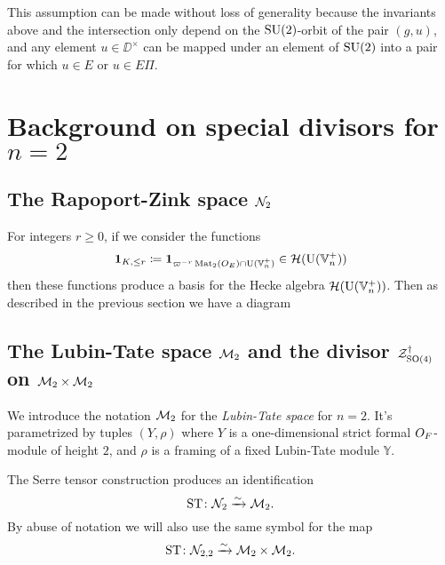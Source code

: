 This assumption can be made without loss of generality because
the invariants above and the intersection only depend
on the $\operatorname{SU}(2)$-orbit of the pair $(g,u)$,
and any element $u \in \DD^\times$ can be mapped under an element of $\operatorname{SU}(2)$
into a pair for which $u \in E$ or $u \in E \Pi$.


\section{Background on special divisors for $n = 2$}
\subsection{The Rapoport-Zink space $\mathcal N_2$}
For integers $r \ge 0$, if we consider the functions
\[ \mathbf{1}_{K, \le r} \coloneqq \mathbf{1}_{\varpi^{-r} \operatorname{Mat}_2(O_E) \cap \operatorname{U}(\mathbb V_n^+)} \in \mathcal H(\operatorname{U}(\mathbb V_n^+)) \]
then these functions produce a basis for the Hecke algebra $\mathcal H(\operatorname{U}(\mathbb V_n^+))$.
Then as described in the previous section we have a diagram
\begin{center}
\end{center}

\subsection{The Lubin-Tate space $\mathcal M_2$ and the divisor $\mathcal Z^{\dagger}_{\operatorname{SO}(4)}$ on $\mathcal M_2 \times \mathcal M_2$}
We introduce the notation $\mathcal M_2$ for the \emph{Lubin-Tate space} for $n = 2$.
It's parametrized by tuples $(Y, \rho)$
where $Y$ is a one-dimensional strict formal $O_F$-module of height $2$,
and $\rho$ is a framing of a fixed Lubin-Tate module $\mathbb{Y}$.

\begin{proposition}
  The Serre tensor construction produces an identification
  \[ \operatorname{ST} \colon \mathcal N_2 \xrightarrow{\sim} \mathcal M_2. \]
  By abuse of notation we will also use the same symbol for the map
  \[ \operatorname{ST} \colon \mathcal N_{2,2} \xrightarrow{\sim} \mathcal M_2 \times \mathcal M_2. \]
\end{proposition}

